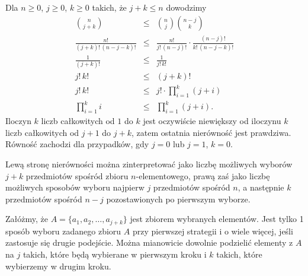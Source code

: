 \subsection{} %
Dla $n\ge0$, $j\ge0$, $k\ge0$ takich, że $j+k\le n$ dowodzimy
\begin{eqnarray*}
	\binom{n}{j+k} &\le& \binom{n}{j}\binom{n-j}{k} \\
	\frac{n!}{(j+k)!\,(n-j-k)!} &\le& \frac{n!}{j!\,(n-j)!}\cdot\frac{(n-j)!}{k!\,(n-j-k)!} \\
	\frac{1}{(j+k)!} &\le& \frac{1}{j!\,k!} \\
	j!\,k! &\le& (j+k)! \\
	j!\,k! &\le& j!\cdot\prod_{i=1}^k(j+i) \\
	\prod_{i=1}^ki &\le& \prod_{i=1}^k(j+i).
\end{eqnarray*}
Iloczyn $k$ liczb całkowitych od $1$ do $k$ jest oczywiście niewiększy od iloczynu $k$ liczb całkowitych od $j+1$ do $j+k$, zatem ostatnia nierówność jest prawdziwa. Równość zachodzi dla przypadków, gdy $j=0$ lub $j=1$, $k=0$.

Lewą stronę nierówności można zinterpretować jako liczbę możliwych wyborów $j+k$ przedmiotów spośród zbioru $n$-elementowego, prawą zaś jako liczbę możliwych sposobów wyboru najpierw $j$ przedmiotów spośród $n$, a następnie $k$ przedmiotów spośród $n-j$ pozostawionych po pierwszym wyborze.

Załóżmy, że $A=\{a_1,a_2,\dots,a_{j+k}\}$ jest zbiorem wybranych elementów. Jest tylko 1 sposób wyboru zadanego zbioru $A$ przy pierwszej strategii i o wiele więcej, jeśli zastosuje się drugie podejście. Można mianowicie dowolnie podzielić elementy z $A$ na $j$ takich, które będą wybierane w pierwszym kroku i $k$ takich, które wybierzemy w drugim kroku.

